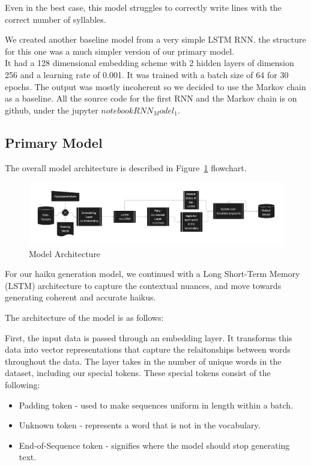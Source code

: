 \documentclass{article} %
\begin{document}
Even in the best case, this model struggles to correctly write lines with the correct number of syllables.

We created another baseline model from a very simple LSTM RNN. the structure for this one was a much simpler version of our primary model.\\

It had a 128 dimensional embedding scheme with 2 hidden layers of dimension 256 and a learning rate of 0.001. It was trained with a batch size of 64
for 30 epochs. The output was mostly incoherent so we decided to use the Markov chain as a baseline. All the source code for the first RNN and the 
Markov chain is on github, under the jupyter $notebook RNN_Model_1$.
 
 

\subsection{Primary Model}

The overall model architecture is described in Figure~\ref{fig:flowchart} flowchart.

\begin{figure}[h]
  \begin{center}
  \includegraphics[width=1\textwidth]{Figs/HaikuLSTMArch.png}
  \end{center}
  \caption{Model Architecture}
  \label{fig:flowchart}
\end{figure}

For our haiku generation model, we continued with a Long Short-Term Memory (LSTM) architecture to capture the contextual nuances, and move towards generating coherent and accurate haikus.

The architecture of the model is as follows:

First, the input data is passed through an embedding layer. 
It transforms this data into vector representations that capture the 
relaitonships between words throughout the data. 
The layer takes in the number of unique words in the dataset, 
including our special tokens. 
These special tokens consist of the following:
\begin{itemize}
  \item Padding token - used to make sequences uniform in length within a batch.
  \item Unknown token - represents a word that is not in the vocabulary.
  \item End-of-Sequence token - signifies where the model should stop generating text.
\end{itemize}
\end{document}
